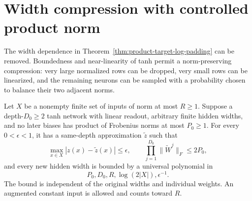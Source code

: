 \section{Width compression with controlled product norm}
\label{sec:pf-width-compression}

The width dependence in Theorem~\ref{thm:product-target-log-padding}
can be removed. Boundedness and near-linearity of tanh permit a
norm-preserving compression: very large normalized rows can be dropped,
very small rows can be linearized, and the remaining neurons can be
sampled with a probability chosen to balance their two adjacent norms.

\begin{theorem}
\label{thm:pf-width-compression}
Let $X$ be a nonempty finite set of inputs of norm at most $R\ge1$.
Suppose a depth-$D_0\ge2$ tanh network with linear readout, arbitrary
finite hidden widths, and no later biases has product of Frobenius norms
at most $P_0\ge1$. For every $0<\epsilon<1$, it has a same-depth
approximation $\widetilde z$ such that
\[
 \max_{x\in X}|z(x)-\widetilde z(x)|\le\epsilon,
 \qquad \prod_{j=1}^{D_0}\|\widetilde W^j\|_F\le2P_0,
\]
and every new hidden width is bounded by a universal polynomial in
\[
 P_0,D_0,R,\log(2|X|),\epsilon^{-1}.
\]
The bound is independent of the original widths and individual weights.
An augmented constant input is allowed and counts toward $R$.
\end{theorem}

